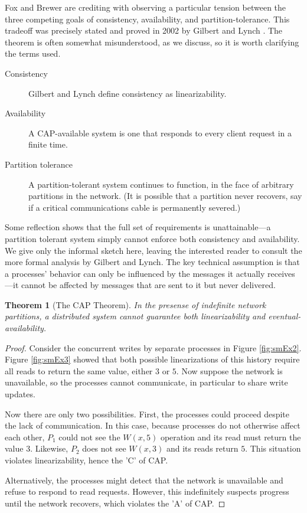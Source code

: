 \documentclass[]             %
{NASA}                       %
\newtheorem{theorem}{Theorem}[section]
\theoremstyle{definition}
\begin{document}
Fox and Brewer \cite{1999foxbrewer} are crediting with observing a
particular tension between the three competing goals of consistency,
availability, and partition-tolerance. This tradeoff was precisely
stated and proved in 2002 by Gilbert and Lynch
\cite{2002gilbertlynchCAP}.  The theorem is often somewhat
misunderstood, as we discuss, so it is worth clarifying the terms
used.

\begin{description}
\item[Consistency] Gilbert and Lynch define consistency as linearizability.
\item[Availability] A CAP-available system is one that responds to
  every client request in a finite time.
\item[Partition tolerance] A partition-tolerant system continues to
  function, in the face of arbitrary partitions in the network. (It is
  possible that a partition never recovers, say if a critical
  communications cable is permanently severed.)
\end{description}

Some reflection shows that the full set of requirements is
unattainable---a partition tolerant system simply cannot enforce both
consistency and availability. We give only the informal sketch here,
leaving the interested reader to consult the more formal analysis by
Gilbert and Lynch. The key technical assumption is that a processes'
behavior can only be influenced by the messages it actually
receives---it cannot be affected by messages that are sent to it but
never delivered.

\begin{theorem}[The CAP Theorem]
  \label{thm:cap}
  In the presense of indefinite network partitions, a distributed system
  cannot guarantee both linearizability and eventual-availability.
\end{theorem}
\begin{proof}
  Consider the concurrent writes by separate processes in Figure
  \ref{fig:smEx2}.  Figure \ref{fig:smEx3} showed that both possible
  linearizations of this history require all reads to return the same
  value, either $3$ or $5$. Now suppose the network is unavailable, so
  the processes cannot communicate, in particular to share write
  updates.

  Now there are only two possibilities. First, the processes could
  proceed despite the lack of communication. In this case, because
  processes do not otherwise affect each other, $P_1$ could not see
  the $W(x,5)$ operation and its read must return the value
  $3$. Likewise, $P_2$ does not see $W(x,3)$ and its reads return
  $5$. This situation violates linearizability, hence the 'C' of CAP.

  Alternatively, the processes might detect that the network is
  unavailable and refuse to respond to read requests. However, this
  indefinitely suspects progress until the network recovers, which
  violates the 'A' of CAP.
\end{proof}
\end{document}
